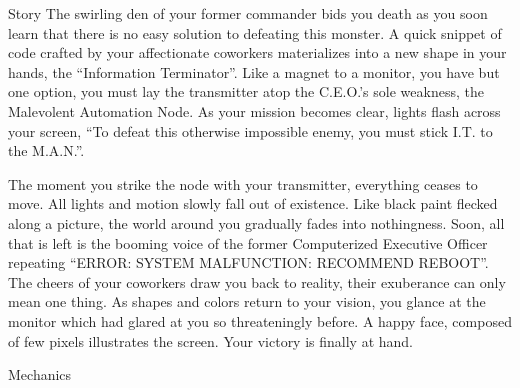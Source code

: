 \documentclass[12pt]{report}
\begin{document}
\begin{section}{Story}
The swirling den of your former commander bids you death as you soon learn that there is no 
easy solution to defeating this monster. A quick snippet of code crafted by your affectionate 
coworkers materializes into a new shape in your hands, the ``Information Terminator''. Like a 
magnet to a monitor, you have but one option, you must lay the transmitter atop the C.E.O.'s 
sole weakness, the Malevolent Automation Node. As your mission becomes clear, lights flash across 
your screen, ``To defeat this otherwise impossible enemy, you must stick I.T. to the M.A.N.''.

The moment you strike the node with your transmitter, everything ceases to move. All lights and 
motion slowly fall out of existence. Like black paint flecked along a picture, the world around 
you gradually fades into nothingness. Soon, all that is left is the booming voice of the former 
Computerized Executive Officer repeating ``ERROR: SYSTEM MALFUNCTION: RECOMMEND REBOOT''. The 
cheers of your coworkers draw you back to reality, their exuberance can only mean one thing. As 
shapes and colors return to your vision, you glance at the monitor which had glared at you so 
threateningly before. A happy face, composed of few pixels illustrates the screen. Your victory 
is finally at hand.

\end{section}

\begin{section}{Mechanics}
\end{section}
\end{document}
